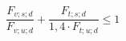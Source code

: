 \documentclass[12pt]{article}
\begin{document}
\begin{displaymath}
\frac {F_{v;s;d}} {F_{v;u;d}} + \frac {F_{t;s;d}} {1,4 \cdot F_{t;u;d}} \leq 1
\end{displaymath}
\end{document}
